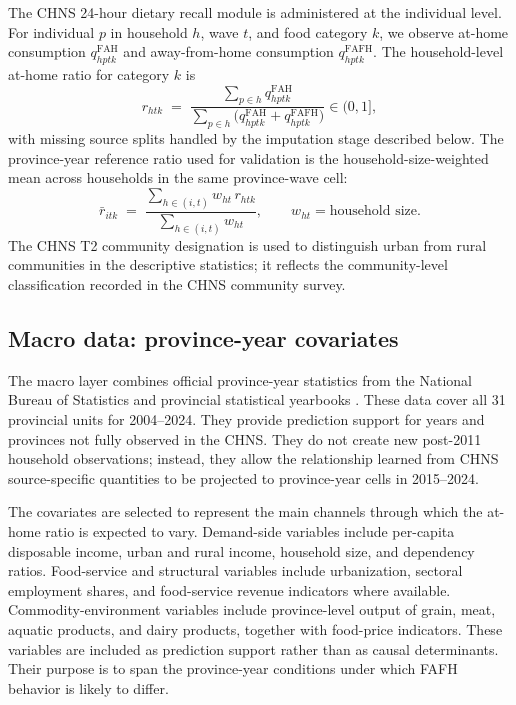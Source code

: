 \documentclass[preprint,12pt,authoryear]{elsarticle}
\begin{document}
The CHNS 24-hour dietary recall module is administered at the individual level. For individual $p$ in household $h$, wave $t$, and food category $k$, we observe at-home consumption $q^{\mathrm{FAH}}_{hpt k}$ and away-from-home consumption $q^{\mathrm{FAFH}}_{hpt k}$. The household-level at-home ratio for category $k$ is
\begin{equation}
r_{htk} \;=\; \frac{\sum_{p\in h} q^{\mathrm{FAH}}_{hpt k}}{\sum_{p\in h}\!\bigl(q^{\mathrm{FAH}}_{hpt k} + q^{\mathrm{FAFH}}_{hpt k}\bigr)} \in (0,1],
\label{eq:house_ratio}
\end{equation}
with missing source splits handled by the imputation stage described below. The province-year reference ratio used for validation is the household-size-weighted mean across households in the same province-wave cell:
\begin{equation}
\bar r_{itk} \;=\; \frac{\sum_{h\in(i,t)} w_{ht}\, r_{htk}}{\sum_{h\in(i,t)} w_{ht}}, \qquad w_{ht} = \text{household size}.
\label{eq:prov_ratio}
\end{equation}
The CHNS T2 community designation is used to distinguish urban from rural communities in the descriptive statistics; it reflects the community-level classification recorded in the CHNS community survey.

\subsection{Macro data: province-year covariates}

The macro layer combines official province-year statistics from the National Bureau of Statistics and provincial statistical yearbooks \citep{NBS_China}. These data cover all 31 provincial units for 2004--2024. They provide prediction support for years and provinces not fully observed in the CHNS. They do not create new post-2011 household observations; instead, they allow the relationship learned from CHNS source-specific quantities to be projected to province-year cells in 2015--2024.

The covariates are selected to represent the main channels through which the at-home ratio is expected to vary. Demand-side variables include per-capita disposable income, urban and rural income, household size, and dependency ratios. Food-service and structural variables include urbanization, sectoral employment shares, and food-service revenue indicators where available. Commodity-environment variables include province-level output of grain, meat, aquatic products, and dairy products, together with food-price indicators. These variables are included as prediction support rather than as causal determinants. Their purpose is to span the province-year conditions under which FAFH behavior is likely to differ.
\end{document}
